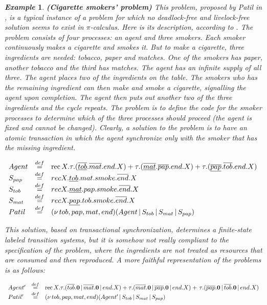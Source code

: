 \documentclass[submission,copyright,creativecommons]{eptcs}
\newcommand{\eqdef}{{\mbox{${\stackrel{def}{=}}$}}}
\newcommand{\restr}[1]{\mbox{$({\bf\nu} #1)$}}
\newcommand{\para}{\mbox{$\,|\,$}}
\newcommand{\recx}[1]{\mbox{rec$\, X.#1$}}
\newcommand{\nil}{\mbox{\bf 0}}
\newtheorem{aexample}{\it Example}
\newenvironment{example}{\begin{aexample} }{\end{aexample}}
\begin{document}
\begin{example}\label{patil} {\bf (Cigarette smokers' problem)}
This problem, proposed by Patil in \cite{Pat71}, is a typical instance
of a problem for which no deadlock-free and livelock-free solution seems to exist in $\pi$-calculus.
Here is its description, according to \cite{Pet81}.
The problem consists of  four processes: an agent and three smokers. Each smoker continuously makes a 
cigarette and smokes it. But to make a cigarette, three ingredients are needed: tobacco, paper and matches.
One of the smokers has paper, another tobacco and the third has matches. The agent has an infinite supply
of all three. The agent places two of the ingredients on the table. The smokers who has the remaining ingredient
can then make and smoke a cigarette, signalling the agent upon completion. The agent then puts out 
another two of the three ingredients and the cycle repeats. The problem is to define the code for the smoker
processes to determine which of the three processes should proceed (the agent is fixed and cannot be changed).
Clearly, a solution to the problem is to have an atomic transaction in which the agent synchronize
only with the smoker that has the missing ingredient.

$
\begin{array}{lcl}
Agent &  \eqdef & \recx{ \tau.(\underline{\overline{tob}}.\overline{mat}.end.X) + 
\tau.(\underline{\overline{mat}}.\overline{pap}.end.X) + \tau.(\underline{\overline{pap}}.\overline{tob}.end.X)} \\
S_{pap} &  \eqdef & rec X.\underline{tob}.mat.smoke.\overline{end}.X \\ 
S_{tob} &  \eqdef & rec X.\underline{mat}.pap.smoke.\overline{end}.X \\ 
S_{mat} &  \eqdef & rec X.\underline{pap}.tob.smoke.\overline{end}.X \\ 
Patil & \eqdef & \restr{\,tob,pap,mat,end}(Agent \para S_{tob} \para S_{mat} \para S_{pap})
\end{array}
$

This solution, based on transactional synchronization, determines a finite-state labeled transition systems, but it is somehow not really compliant to
the specification of the problem, where the ingredients are not treated as resources that are consumed and then reproduced. A more faithful representation of the problems is as follows:

$
\begin{array}{lcl}
Agent' &  \eqdef & \recx{ \tau.(\overline{tob}.\nil \para \overline{mat}.\nil \para end.X) + 
\tau.(\overline{mat}.\nil \para \overline{pap}.\nil \para end.X) }  + \, \tau.(\overline{pap}.\nil \para \overline{tob}.\nil \para end.X) \\
Patil' & \eqdef & \restr{\,tob,pap,mat,end}(Agent' \para S_{tob} \para S_{mat} \para S_{pap})
\end{array}
$


\end{example}
\end{document}

